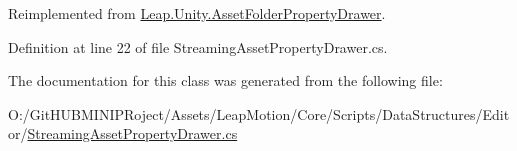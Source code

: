 Reimplemented from \mbox{\hyperlink{class_leap_1_1_unity_1_1_asset_folder_property_drawer_a758121df1db1aa0c8e81154f239297a6}{Leap.\+Unity.\+Asset\+Folder\+Property\+Drawer}}.



Definition at line 22 of file Streaming\+Asset\+Property\+Drawer.\+cs.



The documentation for this class was generated from the following file\+:\begin{DoxyCompactItemize}
\item 
O\+:/\+Git\+H\+U\+B\+M\+I\+N\+I\+P\+Roject/\+Assets/\+Leap\+Motion/\+Core/\+Scripts/\+Data\+Structures/\+Editor/\mbox{\hyperlink{_streaming_asset_property_drawer_8cs}{Streaming\+Asset\+Property\+Drawer.\+cs}}\end{DoxyCompactItemize}
